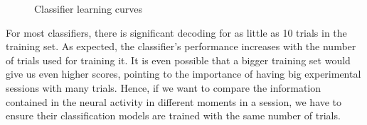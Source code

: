     \begin{figure}
        \centering
        \caption{Classifier learning curves}
        \label{fig:clf_curves}
    \end{figure}
    For most classifiers, there is significant decoding for as little as 10 trials in the training set. As expected, the classifier's performance increases with the number of trials used for training it. It is even possible that a bigger training set would give us even higher scores, pointing to the importance of having big experimental sessions with many trials. Hence, if we want to compare the information contained in the neural activity in different moments in a session, we have to ensure their classification models are trained with the same number of trials.
